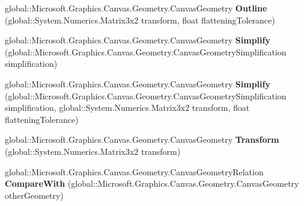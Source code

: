 \begin{DoxyCompactItemize}
\mbox{\label{interface_microsoft_1_1_graphics_1_1_canvas_1_1_geometry_1_1_i_canvas_geometry_ab685f87179af5eed5881feb2e4aa5c22}} 
global\+::\+Microsoft.\+Graphics.\+Canvas.\+Geometry.\+Canvas\+Geometry {\bfseries Outline} (global\+::\+System.\+Numerics.\+Matrix3x2 transform, float flattening\+Tolerance)
\item 
\mbox{\label{interface_microsoft_1_1_graphics_1_1_canvas_1_1_geometry_1_1_i_canvas_geometry_a1420c252e6995b540a402dc6d2088ff0}} 
global\+::\+Microsoft.\+Graphics.\+Canvas.\+Geometry.\+Canvas\+Geometry {\bfseries Simplify} (global\+::\+Microsoft.\+Graphics.\+Canvas.\+Geometry.\+Canvas\+Geometry\+Simplification simplification)
\item 
\mbox{\label{interface_microsoft_1_1_graphics_1_1_canvas_1_1_geometry_1_1_i_canvas_geometry_a4b3fad1c94d6807ac4628caa31ddcdfa}} 
global\+::\+Microsoft.\+Graphics.\+Canvas.\+Geometry.\+Canvas\+Geometry {\bfseries Simplify} (global\+::\+Microsoft.\+Graphics.\+Canvas.\+Geometry.\+Canvas\+Geometry\+Simplification simplification, global\+::\+System.\+Numerics.\+Matrix3x2 transform, float flattening\+Tolerance)
\item 
\mbox{\label{interface_microsoft_1_1_graphics_1_1_canvas_1_1_geometry_1_1_i_canvas_geometry_ac5c73fa815ab9daab0120a273c2a9f7a}} 
global\+::\+Microsoft.\+Graphics.\+Canvas.\+Geometry.\+Canvas\+Geometry {\bfseries Transform} (global\+::\+System.\+Numerics.\+Matrix3x2 transform)
\item 
\mbox{\label{interface_microsoft_1_1_graphics_1_1_canvas_1_1_geometry_1_1_i_canvas_geometry_a2ccaa7f710d287e5e4dd8170deb5f559}} 
global\+::\+Microsoft.\+Graphics.\+Canvas.\+Geometry.\+Canvas\+Geometry\+Relation {\bfseries Compare\+With} (global\+::\+Microsoft.\+Graphics.\+Canvas.\+Geometry.\+Canvas\+Geometry other\+Geometry)
\item 
\mbox{\label{interface_microsoft_1_1_graphics_1_1_canvas_1_1_geometry_1_1_i_canvas_geometry_a05b0590f7526c5e62b664f3c73b3f28e}} 

\end{DoxyCompactItemize}
